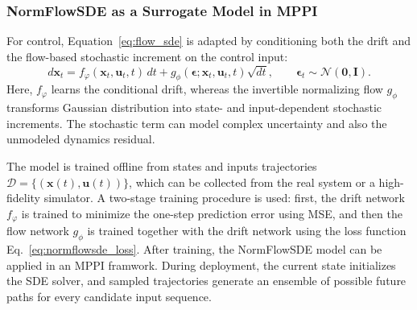 \subsubsection{NormFlowSDE as a Surrogate Model in MPPI}
For control, Equation~\ref{eq:flow_sde} is adapted by conditioning both the drift and the flow-based stochastic increment on the control input:
\begin{equation}
    d\boldsymbol{x}_t
    = f_\varphi(\boldsymbol{x}_t,\boldsymbol{u}_t,t)\,dt
    + g_\phi(\boldsymbol{\epsilon};
        \boldsymbol{x}_t,\boldsymbol{u}_t,t)\sqrt{dt},
    \qquad
    \boldsymbol{\epsilon}_t\sim\mathcal{N}(\boldsymbol{0},\boldsymbol{I}).
    \label{eq:controlled_normflowsde}
\end{equation}
Here, $f_\varphi$ learns the conditional drift, whereas the invertible normalizing flow $g_\phi$ transforms Gaussian distribution into state- and input-dependent stochastic increments. The stochastic term can model complex uncertainty and also the unmodeled dynamics residual. 

The model is trained offline from states and inputs trajectories $\mathcal{D}=\{(\boldsymbol{x}(t),\boldsymbol{u}(t))\}$, which can be collected from the real system or a high-fidelity simulator. A two-stage training procedure is used: first, the drift network $f_\varphi$ is trained to minimize the one-step prediction error using \ac{MSE}, and then the flow network $g_\phi$ is trained together with the drift network using the loss function Eq.~\ref{eq:normflowsde_loss}. After training, the NormFlowSDE model can be applied in an \ac{MPPI} framwork. During deployment, the current state initializes the SDE solver, and sampled trajectories generate an ensemble of possible future paths for every candidate input sequence.


